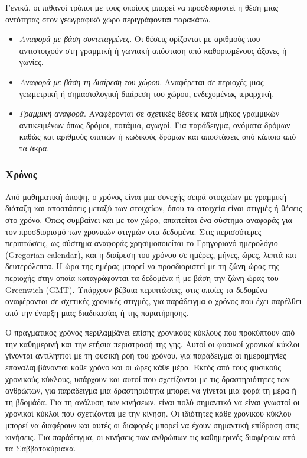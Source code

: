 \documentclass[12pt,twoside,openright]{report}
\begin{document}
Γενικά, οι πιθανοί τρόποι με τους οποίους μπορεί να προσδιοριστεί η θέση μιας οντότητας στον γεωγραφικό χώρο περιγράφονται παρακάτω.
\begin{itemize}
\item\emph{Αναφορά με βάση συντεταγμένες}. Οι θέσεις ορίζονται με αριθμούς που αντιστοιχούν στη γραμμική ή γωνιακή απόσταση από καθορισμένους άξονες ή γωνίες.
\item\emph{Αναφορά με βάση τη διαίρεση του χώρου}. Αναφέρεται σε περιοχές μιας γεωμετρική ή σημασιολογική διαίρεση του χώρου, ενδεχομένως ιεραρχική.
\item\emph{Γραμμική αναφορά}.  Αναφέρονται σε σχετικές θέσεις κατά μήκος γραμμικών αντικειμένων όπως δρόμοι, ποτάμια, αγωγοί.  Για παράδειγμα, ονόματα δρόμων καθώς και αριθμούς σπιτιών ή κωδικούς δρόμων και αποστάσεις από κάποιο από τα άκρα.
\end{itemize}


\subsubsection*{Χρόνος}
Από μαθηματική άποψη, ο χρόνος είναι μια συνεχής σειρά στοιχείων με γραμμική διάταξη και αποστάσεις μεταξύ των στοιχείων, όπου τα στοιχεία είναι στιγμές ή θέσεις στο χρόνο. Όπως συμβαίνει και με τον χώρο, απαιτείται ένα σύστημα αναφοράς για τον προσδιορισμό των χρονικών στιγμών στα δεδομένα. Στις περισσότερες περιπτώσεις, ως σύστημα αναφοράς χρησιμοποιείται το Γρηγοριανό ημερολόγιο \lt (Gregorian calendar), \gt και η διαίρεση του χρόνου σε ημέρες, μήνες, ώρες, λεπτά και δευτερόλεπτα. Η ώρα της ημέρας μπορεί να προσδιοριστεί με τη ζώνη ώρας της περιοχής στην οποία καταγράφονται τα δεδομένα ή με βάση την ζώνη ώρας του \lt Greenwich (GMT). \gt Υπάρχουν βέβαια περιπτώσεις, στις οποίες τα δεδομένα αναφέρονται σε σχετικές χρονικές στιγμές, για παράδειγμα  ο χρόνος που έχει παρέλθει από την έναρξη μιας διαδικασίας ή της παρατήρησης.

Ο πραγματικός χρόνος περιλαμβάνει επίσης χρονικούς κύκλους που προκύπτουν από την καθημερινή και την ετήσια περιστροφή της γης. Αυτοί οι φυσικοί χρονικοί κύκλοι γίνονται αντιληπτοί με τη φυσική ροή του χρόνου, για παράδειγμα οι ημερομηνίες επαναλαμβάνονται κάθε χρόνο και οι ώρες κάθε μέρα. Εκτός από τους φυσικούς χρονικούς κύκλους, υπάρχουν και αυτοί που σχετίζονται με τις δραστηριότητες των ανθρώπων, για παράδειγμα μια δραστηριότητα μπορεί να γίνεται μια φορά τη μέρα ή τη βδομάδα. Για τη ανάλυση των κινήσεων, είναι πολύ σημαντικό να είναι γνωστοί οι χρονικοί κύκλοι που σχετίζονται με την κίνηση. Οι ιδιότητες κάθε χρονικού κύκλου μπορεί να διαφέρουν και αυτές οι διαφορές μπορεί να έχουν σημαντική επίδραση στις κινήσεις. Για παράδειγμα, οι κινήσεις των ανθρώπων τις καθημερινές διαφέρουν από τα Σαββατοκύριακα. 
\end{document}
